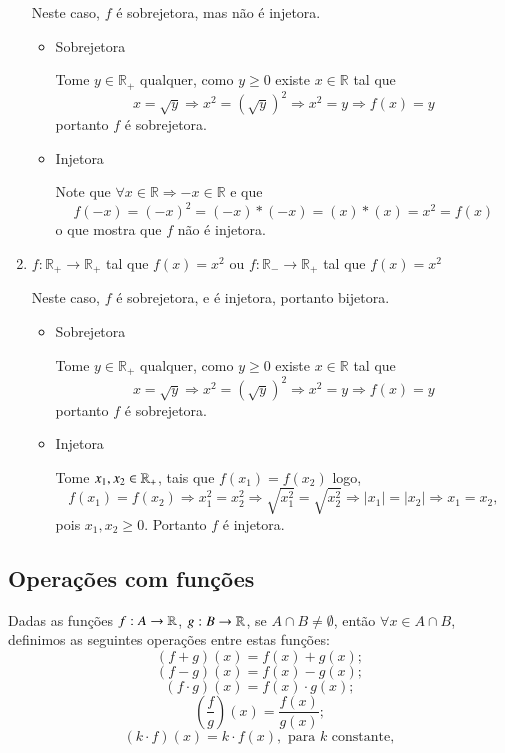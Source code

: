 \begin{exem}
\begin{enumerate}
  Neste caso, $f$ é sobrejetora, mas não é injetora.

  \begin{dem}
   \begin{itemize}
    \item Sobrejetora

    Tome $y \in \mathbb{R_{+}}$ qualquer, como $y \geq 0$ existe $x \in \mathbb{R}$ tal que
    \[x = \sqrt{y} \Rightarrow x^2 = (\sqrt{y})^2 \Rightarrow x^2 = y \Rightarrow f(x) = y \]
    portanto $f$ é sobrejetora.
    \fim
    \item Injetora

    Note que $ \forall x \in \mathbb{R} \Rightarrow -x \in \mathbb{R}$ e que
    \[f(-x)= (-x)^2 = (-x)*(-x) = (x)*(x) = x^2 = f(x)\]
    o que mostra que $f$ não é injetora.

   \end{itemize}
  \end{dem}

  \item $f: \mathbb{R_{+}} \rightarrow \mathbb{R_{+}}$ tal que $f(x) = x^2$ ou $f: \mathbb{R_{-}} \rightarrow \mathbb{R_{+}}$ tal que $f(x) = x^2$

  Neste caso, $f$ é sobrejetora, e é injetora, portanto bijetora.

  \begin{dem}
   \begin{itemize}
    \item Sobrejetora

    Tome $y \in \mathbb{R_{+}}$ qualquer, como $y \geq 0$ existe $x \in \mathbb{R}$ tal que
    \[x = \sqrt{y} \Rightarrow x^2 = (\sqrt{y})^2 \Rightarrow x^2 = y \Rightarrow f(x) = y\]
    portanto $f$ é sobrejetora.
    \fim
    \item Injetora

    Tome $x_1, x_2 \in \mathbb{R}_{+}$, tais que $f(x_1) = f(x_2)$ logo,
    \[f(x_1) = f(x_2) \Rightarrow x_1^2= x_2^2 \Rightarrow \sqrt{x_1^2}= \sqrt{x_2^2} \Rightarrow |x_1|= |x_2| \Rightarrow x_1= x_2, \]
    pois $x_1, x_2 \geqslant 0$. Portanto $f$ é injetora.

   \end{itemize}
  \end{dem}

 \end{enumerate}

\end{exem}

\subsection{Operações com funções}
Dadas as funções $f: A \rightarrow \mathbb{R}$, $g: B \rightarrow \mathbb{R}$, se $A \cap B \neq \emptyset$, então $\forall x \in A \cap B$, definimos as seguintes operações entre estas funções:
\[(f + g)(x)= f(x) + g(x); \]
\[(f - g)(x)= f(x) - g(x); \]
\[(f \cdot g)(x)= f(x) \cdot g(x); \]
\[ \left( \frac{f}{g} \right) (x)= \frac{f(x)}{g(x)} ;\]
\[(k \cdot f)(x)= k \cdot f(x), \text{ para } k \text{ constante} ,\]

